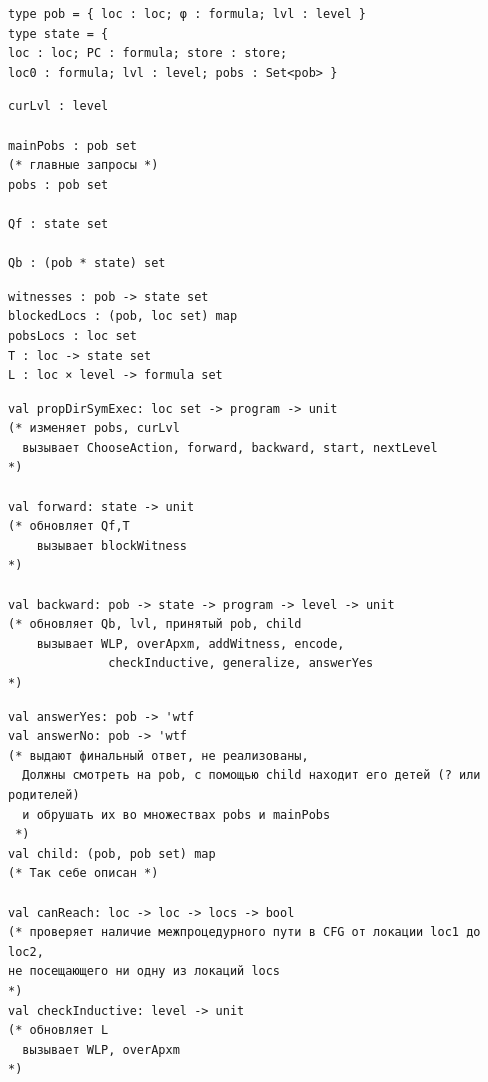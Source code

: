 \documentclass[aspectratio=169
  , xcolor={svgnames}
  , hyperref={ colorlinks,citecolor=Blue
             , linkcolor=DarkRed,urlcolor=DarkBlue}
  , usenames, dvipsnames
  , russian
  ]{beamer}
\begin{document}
\begin{frame}[fragile]
\begin{verbatim}
type pob = { loc : loc; φ : formula; lvl : level }
type state = {
loc : loc; PC : formula; store : store;
loc0 : formula; lvl : level; pobs : Set<pob> }

\end{verbatim}
\end{frame}
\begin{frame}[fragile]

\begin{minipage}{0.49\linewidth}
\begin{verbatim}
curLvl : level

mainPobs : pob set
(* главные запросы *)
pobs : pob set

Qf : state set

Qb : (pob * state) set
\end{verbatim}
\end{minipage}\hspace{0cm}
\begin{minipage}{0.49\linewidth}
\begin{verbatim}
witnesses : pob -> state set 
blockedLocs : (pob, loc set) map
pobsLocs : loc set
T : loc -> state set
L : loc × level -> formula set
\end{verbatim}

\end{minipage}

\end{frame}

\begin{frame}[fragile]
\begin{verbatim}
val propDirSymExec: loc set -> program -> unit 
(* изменяет pobs, curLvl
  вызывает ChooseAction, forward, backward, start, nextLevel
*)

val forward: state -> unit 
(* обновляет Qf,T
    вызывает blockWitness 
*)

val backward: pob -> state -> program -> level -> unit 
(* обновляет Qb, lvl, принятый pob, child
    вызывает WLP, overApxm, addWitness, encode,
              checkInductive, generalize, answerYes
*)
\end{verbatim}
\end{frame}

\begin{frame}[fragile]
\begin{verbatim}
val answerYes: pob -> 'wtf
val answerNo: pob -> 'wtf
(* выдают финальный ответ, не реализованы,
  Должны смотреть на pob, с помощью child находит его детей (? или родителей) 
  и обрушать их во множествах pobs и mainPobs
 *)
val child: (pob, pob set) map 
(* Так себе описан *)

val canReach: loc -> loc -> locs -> bool 
(* проверяет наличие межпроцедурного пути в CFG от локации loc1 до loc2, 
не посещающего ни одну из локаций locs
*)
val checkInductive: level -> unit 
(* обновляет L
  вызывает WLP, overApxm
*)
\end{verbatim}
\end{frame}
\end{document}
